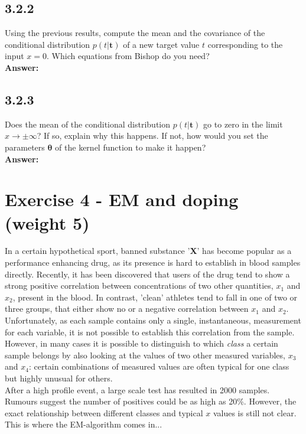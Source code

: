 \documentclass[a4paper]{article}
\begin{document}
\subsection*{3.2.2}

Using the previous results, compute the mean and the covariance of the conditional distribution $p(t | \textbf{t})$ of a new target value $t$ corresponding to the input $x = 0$. Which equations from Bishop do you need?\\

\textbf{Answer:}\\







\subsection*{3.2.3}

Does the mean of the conditional distribution $p(t | \textbf{t})$ go to zero in the limit $x \to \pm \infty$? If so, explain why this happens. If not, how would you set the parameters $\boldsymbol{\theta}$ of the kernel function to make it happen?\\

\textbf{Answer:}\\

 


\section*{Exercise 4 - EM and doping (weight 5)}

In a certain hypothetical sport, banned substance '\textbf{X}' has become popular as a performance enhancing drug, as its presence is hard to establish in blood samples directly. Recently, it has been discovered that users of the drug tend to show a strong positive correlation between concentrations of two other quantities, $x_1$ and $x_2$, present in the blood. In contrast, 'clean' athletes tend to fall in one of two or three groups, that either show no or a negative correlation between $x_1$ and $x_2$. Unfortunately, as each sample contains only a single, instantaneous, measurement for each variable, it is not possible to establish this correlation from the sample. However, in many cases it is possible to distinguish to which \textit{class} a certain sample belongs by also looking at the values of two other measured variables, $x_3$ and $x_4$: certain combinations of measured values are often typical for one class but highly unusual for others.\\
After a high profile event, a large scale test has resulted in 2000 samples. Rumours suggest the number of positives could be as high as 20\%. However, the exact relationship between different classes and typical $x$ values is still not clear. This is where the EM-algorithm comes in...\\
\end{document}
